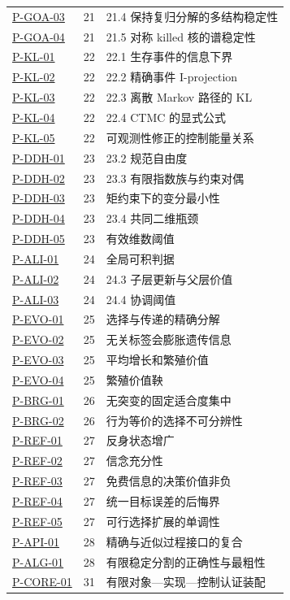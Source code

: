 \documentclass[
  11pt,
  oneside]{book}
\begin{document}
{\begin{longtable}[]{@{}lrl@{}}
\hyperref[p-goa-03]{P-GOA-03} & 21 & 21.4 保持复归分解的多结构稳定性 \\
\hyperref[p-goa-04]{P-GOA-04} & 21 & 21.5 对称 killed 核的谱稳定性 \\
\hyperref[p-kl-01]{P-KL-01} & 22 & 22.1 生存事件的信息下界 \\
\hyperref[p-kl-02]{P-KL-02} & 22 & 22.2 精确事件 I-projection \\
\hyperref[p-kl-03]{P-KL-03} & 22 & 22.3 离散 Markov 路径的 KL \\
\hyperref[p-kl-04]{P-KL-04} & 22 & 22.4 CTMC 的显式公式 \\
\hyperref[p-kl-05]{P-KL-05} & 22 & 可观测性修正的控制能量关系 \\
\hyperref[p-ddh-01]{P-DDH-01} & 23 & 23.2 规范自由度 \\
\hyperref[p-ddh-02]{P-DDH-02} & 23 & 23.3 有限指数族与约束对偶 \\
\hyperref[p-ddh-03]{P-DDH-03} & 23 & 矩约束下的变分最小性 \\
\hyperref[p-ddh-04]{P-DDH-04} & 23 & 23.4 共同二维瓶颈 \\
\hyperref[p-ddh-05]{P-DDH-05} & 23 & 有效维数阈值 \\
\hyperref[p-ali-01]{P-ALI-01} & 24 & 全局可积判据 \\
\hyperref[p-ali-02]{P-ALI-02} & 24 & 24.3 子层更新与父层价值 \\
\hyperref[p-ali-03]{P-ALI-03} & 24 & 24.4 协调阈值 \\
\hyperref[p-evo-01]{P-EVO-01} & 25 & 选择与传递的精确分解 \\
\hyperref[p-evo-02]{P-EVO-02} & 25 & 无关标签会膨胀遗传信息 \\
\hyperref[p-evo-03]{P-EVO-03} & 25 & 平均增长和繁殖价值 \\
\hyperref[p-evo-04]{P-EVO-04} & 25 & 繁殖价值鞅 \\
\hyperref[p-brg-01]{P-BRG-01} & 26 & 无突变的固定适合度集中 \\
\hyperref[p-brg-02]{P-BRG-02} & 26 & 行为等价的选择不可分辨性 \\
\hyperref[p-ref-01]{P-REF-01} & 27 & 反身状态增广 \\
\hyperref[p-ref-02]{P-REF-02} & 27 & 信念充分性 \\
\hyperref[p-ref-03]{P-REF-03} & 27 & 免费信息的决策价值非负 \\
\hyperref[p-ref-04]{P-REF-04} & 27 & 统一目标误差的后悔界 \\
\hyperref[p-ref-05]{P-REF-05} & 27 & 可行选择扩展的单调性 \\
\hyperref[p-api-01]{P-API-01} & 28 & 精确与近似过程接口的复合 \\
\hyperref[p-alg-01]{P-ALG-01} & 28 & 有限稳定分割的正确性与最粗性 \\
\hyperref[p-core-01]{P-CORE-01} & 31 & 有限对象---实现---控制认证装配 \\
\end{longtable}
}
\end{document}
